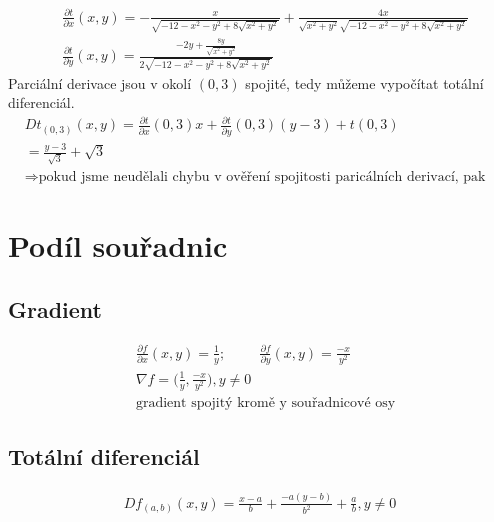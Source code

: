 \documentclass[a4paper]{article}
\newcommand{\tab}{\hspace{1cm}}
\begin{document}
\begin{align*}
	 & \frac{\partial t}{\partial x} (x,y) = - \frac{x}{\sqrt{-12 - x^2 - y^2 + 8 \sqrt{x^2 + y^2}}} + \frac{4x}{\sqrt{x^2 + y^2} \sqrt{-12 - x^2 - y^2 + 8 \sqrt{x^2 + y^2}}} \\
	 & \frac{\partial t}{\partial y} (x,y) = \frac{-2 y + \frac{8 y}{\sqrt{x^2 + y^2}}}{2 \sqrt{-12 - x^2 - y^2 + 8 \sqrt{x^2 + y^2}}}
\end{align*}
Parciální derivace jsou v okolí $(0,3)$ spojité, tedy můžeme vypočítat totální diferenciál.
\begin{align*}
	& Dt_{(0,3)}(x,y) = \frac{\partial t}{\partial x} (0, 3) x + \frac{\partial t}{\partial y} (0,3) (y-3) + t(0,3) \\
	& = \frac{y-3}{\sqrt{3}} + \sqrt{3}\\
	& \Rightarrow \text{pokud jsme neudělali chybu v ověření spojitosti paricálních derivací, pak tečná rovina existuje.}
\end{align*}

\section{Podíl souřadnic}

\subsection{Gradient}
\begin{align*}
	& \frac{\partial f}{\partial x} (x,y) = \frac{1}{y}; \tab \frac{\partial f}{\partial y} (x,y) = \frac{-x}{y^2} \\
	& \nabla f = \bigg(\frac{1}{y}, \frac{-x}{y^2}\bigg), y \ne 0 \\
	& \text{gradient spojitý kromě y souřadnicové osy}
\end{align*}
\subsection{Totální diferenciál}
\begin{align*}
	Df_{(a,b)}(x,y) = \frac{x-a}{b} + \frac{-a(y-b)}{b^2} + \frac{a}{b}, y \ne 0
\end{align*}
\end{document}
